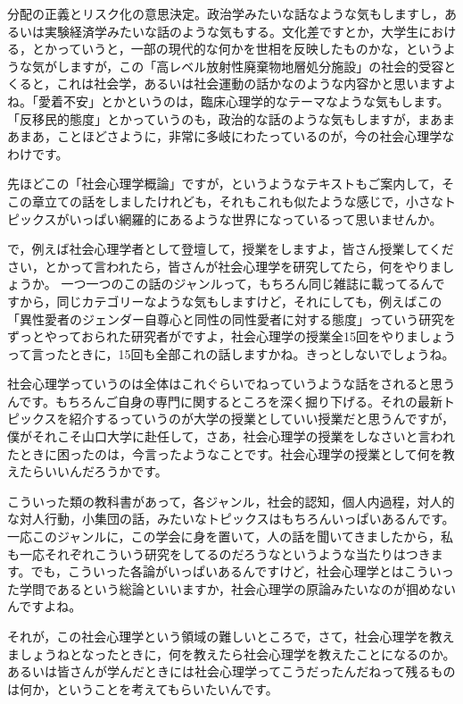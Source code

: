 \documentclass{ltjsbook}
\begin{document}
分配の正義とリスク化の意思決定\parencite{Kotani20211914}。政治学みたいな話なような気もしますし，あるいは実験経済学みたいな話のような気もする。文化差ですとか，大学生における，とかっていうと，一部の現代的な何かを世相を反映したものかな，というような気がしますが，この「高レベル放射性廃棄物地層処分施設」の社会的受容とくると\parencite{Shibata20242214}，これは社会学，あるいは社会運動の話かなのような内容かと思いますよね。「愛着不安」とかというのは\parencite{Kanemasa20171618}，臨床心理学的なテーマなような気もします。「反移民的態度」とかっていうのも\parencite{Kashihara20222014}，政治的な話のような気もしますが，まあまあまあ，ことほどさように，非常に多岐にわたっているのが，今の社会心理学なわけです。

先ほどこの「社会心理学概論」ですが，というようなテキストもご案内して，そこの章立ての話をしましたけれども，それもこれも似たような感じで，小さなトピックスがいっぱい網羅的にあるような世界になっているって思いませんか。

で，例えば社会心理学者として登壇して，授業をしますよ，皆さん授業してください，とかって言われたら，皆さんが社会心理学を研究してたら，何をやりましょうか。
一つ一つのこの話のジャンルって，もちろん同じ雑誌に載ってるんですから，同じカテゴリーなような気もしますけど，それにしても，例えばこの「異性愛者のジェンダー自尊心と同性の同性愛者に対する態度」っていう研究\parencite{Suzuki2015842}をずっとやっておられた研究者がですよ，社会心理学の授業全15回をやりましょうって言ったときに，15回も全部これの話しますかね。きっとしないでしょうね。

社会心理学っていうのは全体はこれぐらいでねっていうような話をされると思うんです。もちろんご自身の専門に関するところを深く掘り下げる。それの最新トピックスを紹介するっていうのが大学の授業としていい授業だと思うんですが，僕がそれこそ山口大学に赴任して，さあ，社会心理学の授業をしなさいと言われたときに困ったのは，今言ったようなことです。社会心理学の授業として何を教えたらいいんだろうかです。

こういった類の教科書があって，各ジャンル，社会的認知，個人内過程，対人的な対人行動，小集団の話，みたいなトピックスはもちろんいっぱいあるんです。一応このジャンルに，この学会に身を置いて，人の話を聞いてきましたから，私も一応それぞれこういう研究をしてるのだろうなというような当たりはつきます。でも，こういった各論がいっぱいあるんですけど，社会心理学とはこういった学問であるという総論といいますか，社会心理学の原論みたいなのが掴めないんですよね。

それが，この社会心理学という領域の難しいところで，さて，社会心理学を教えましょうねとなったときに，何を教えたら社会心理学を教えたことになるのか。あるいは皆さんが学んだときには社会心理学ってこうだったんだねって残るものは何か，ということを考えてもらいたいんです。
\end{document}
